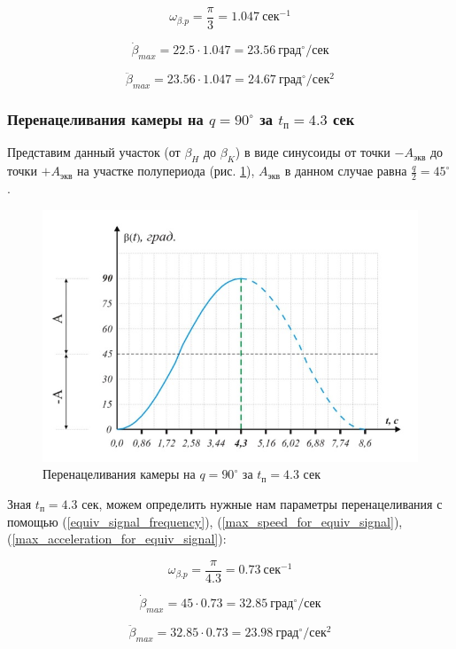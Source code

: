 $$ \omega_{\beta.p} = \frac{\pi}{3} = 1.047 ~\text{сек}^{-1}                            $$

$$ \dot{\beta}_{max} = 22.5 \cdot 1.047 = 23.56 ~\text{град}^{\circ} / \text{сек}       $$

$$ \ddot{\beta}_{max} = 23.56 \cdot 1.047 = 24.67 ~\text{град}^{\circ} / \text{сек}^{2} $$


\subsubsection{Перенацеливания камеры на $q = 90^{\circ}$ за $t_\text{п} = 4.3$ сек}

Представим данный участок (от $\beta_{H}$ до $\beta_{K}$) в виде синусоиды от точки $-A_\text{экв}$ до точки $+A_\text{экв}$ на участке полупериода (рис. \ref{retarget_90grad_4,3sec}), $A_\text{экв}$ в данном случае равна $\frac{q}{2} = 45^{\circ}$.

\begin{figure}[h!]
    \centering
    \includegraphics[keepaspectratio]{./src/pictures/retarget_equivalent_input_signals/90grad_4,3sec}
    \caption{Перенацеливания камеры на $q = 90^{\circ}$ за $t_\text{п} = 4.3$ сек}
    \label{retarget_90grad_4,3sec}
\end{figure}

Зная $t_{\text{п} } = 4.3$ сек, можем определить нужные нам параметры перенацеливания с помощью (\ref{equiv_signal_frequency}), (\ref{max_speed_for_equiv_signal}), (\ref{max_acceleration_for_equiv_signal}):

$$ \omega_{\beta.p} = \frac{\pi}{4.3} = 0.73 ~\text{сек}^{-1}                            $$

$$ \dot{\beta}_{max} = 45 \cdot 0.73 = 32.85 ~\text{град}^{\circ} / \text{сек}           $$

$$ \ddot{\beta}_{max} = 32.85 \cdot 0.73 = 23.98 ~\text{град}^{\circ} / \text{сек}^{2}   $$

\endinput
